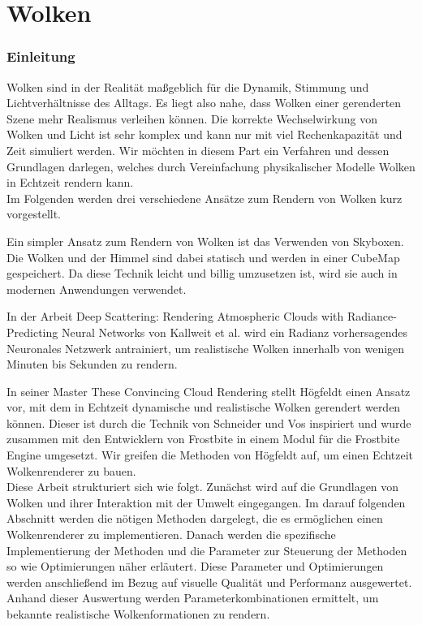 \part{Wolken}
\section{Einleitung}
\label{sec:introduction}

Wolken sind in der Realität maßgeblich für die Dynamik, Stimmung und Lichtverhältnisse des Alltags. Es liegt also nahe, dass Wolken einer gerenderten Szene mehr Realismus verleihen können. Die korrekte Wechselwirkung von Wolken und Licht ist sehr komplex und kann nur mit viel Rechenkapazität und Zeit simuliert werden. Wir möchten in diesem Part ein Verfahren und dessen Grundlagen darlegen, welches durch Vereinfachung physikalischer Modelle Wolken in Echtzeit rendern kann.\\

Im Folgenden werden drei verschiedene Ansätze zum Rendern von Wolken kurz vorgestellt.

Ein simpler Ansatz zum Rendern von Wolken ist das Verwenden von Skyboxen. Die Wolken und der Himmel sind dabei statisch und werden in einer CubeMap gespeichert. Da diese Technik leicht und billig umzusetzen ist, wird sie auch in modernen Anwendungen verwendet.

In der Arbeit Deep Scattering: Rendering Atmospheric Clouds with Radiance-Predicting Neural Networks von Kallweit et al. \cite{Kallweit17} wird ein Radianz vorhersagendes Neuronales Netzwerk antrainiert, um realistische Wolken innerhalb von wenigen Minuten bis Sekunden zu rendern.

In seiner Master These Convincing Cloud Rendering stellt Högfeldt \cite{Högfeldt16} einen Ansatz vor, mit dem in Echtzeit dynamische und realistische Wolken gerendert werden können. Dieser ist durch die Technik von Schneider und Vos \cite{Schneider15} inspiriert und wurde zusammen mit den Entwicklern von Frostbite in einem Modul für die Frostbite Engine umgesetzt. Wir greifen die Methoden von Högfeldt auf, um einen Echtzeit Wolkenrenderer zu bauen.\\

Diese Arbeit strukturiert sich wie folgt. Zunächst wird auf die Grundlagen von Wolken und ihrer Interaktion mit der Umwelt eingegangen. Im darauf folgenden Abschnitt werden die nötigen Methoden dargelegt, die es ermöglichen einen Wolkenrenderer zu implementieren. Danach werden die spezifische Implementierung der Methoden und die Parameter zur Steuerung der Methoden so wie Optimierungen näher erläutert. Diese Parameter und Optimierungen werden anschließend im Bezug auf visuelle Qualität und Performanz ausgewertet. Anhand dieser Auswertung werden Parameterkombinationen ermittelt, um bekannte realistische Wolkenformationen zu rendern.

